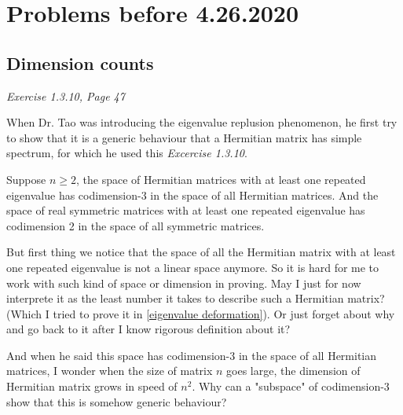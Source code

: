 \section{Problems before 4.26.2020}

\subsection{Dimension counts}

\textit{Exercise 1.3.10, Page 47}

When Dr. Tao was introducing the eigenvalue replusion phenomenon, he first try to show that it is a generic behaviour that a Hermitian matrix has simple spectrum, for which he used this \textit{Excercise 1.3.10}.

\begin{proposition}
    Suppose $n\geq 2$, the space of Hermitian matrices with at least one repeated eigenvalue has codimension-3 in the space of all Hermitian matrices.
     And the space of real symmetric matrices with at least one repeated eigenvalue has codimension 2 in the space of all symmetric matrices.
\end{proposition}


But first thing we notice that the space of all the Hermitian matrix with at least one repeated eigenvalue is not a linear space anymore.  
So it is hard for me to work with such kind of space or dimension in proving. May I just for now interprete it as the least number it takes to describe such a Hermitian matrix? (Which I tried to prove it in \ref{eigenvalue deformation}). Or just forget about why and go back to it after I know rigorous definition about it?

And when he said this space has codimension-3 in the space of all Hermitian matrices, I wonder when the size of matrix $n$ goes large, the dimension of Hermitian matrix grows in speed of $n^2$. Why can a "subspace" of codimension-3 show that this is somehow generic behaviour? 
